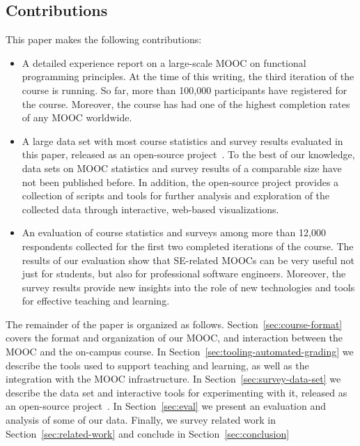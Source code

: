 \documentclass{sig-alternate}
\begin{document}




\subsection{Contributions}

This paper makes the following contributions:

\begin{itemize}

\item A detailed experience report on a large-scale MOOC on functional programming
  principles. At the time of this writing, the third iteration of the course is running. So far,
  more than 100,000 participants have registered for the course. Moreover, the course has had
  one of the highest completion rates of any MOOC worldwide.

\item A large data set with most course statistics and survey results evaluated in this paper,
  released as an open-source project~\cite{progfun-stats}. To the best of our knowledge, data
  sets on MOOC statistics and survey results of a comparable size have not been published
  before. In addition, the open-source project provides a collection of scripts and tools for
  further analysis and exploration of the collected data through interactive, web-based
  visualizations.

\item An evaluation of course statistics and surveys among more than 12,000 respondents
  collected for the first two completed iterations of the course. The results of our evaluation show that SE-related MOOCs can be very useful not just for students, but
  also for professional software engineers.
  Moreover, the survey results provide new insights into the role of new technologies and tools
  for effective teaching and learning.

\end{itemize}

The remainder of the paper is organized as follows. Section~\ref{sec:course-format} covers the format and organization of our MOOC, and interaction between the MOOC and the on-campus course. In Section~\ref{sec:tooling-automated-grading} we describe the tools used to support teaching and learning, as well as the integration with the MOOC infrastructure. In Section~\ref{sec:survey-data-set} we describe the data set and interactive tools for experimenting with it, released as an open-source project~\cite{progfun-stats}. In Section~\ref{sec:eval} we present an evaluation and analysis of some of our data. Finally, we survey related work in Section~\ref{sec:related-work} and conclude in Section~\ref{sec:conclusion}
\end{document}
